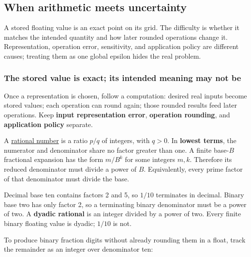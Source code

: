 \subsection{When arithmetic meets uncertainty}\label{01-foundations-i-ch001-when-arithmetic-meets-uncertainty}

\hypertarget{01-foundations-i-ch001-when-arithmetic-meets-uncertainty}{}

A stored floating value is an exact point on its grid. The difficulty is whether it matches the intended quantity and how later rounded operations change it. Representation, operation error, sensitivity, and application policy are different causes; treating them as one global epsilon hides the real problem.

\subsubsection{The stored value is exact; its intended meaning may not be}\label{01-foundations-i-ch001-the-stored-value-is-exact-its-intended-meaning-may-not-be}

\hypertarget{01-foundations-i-ch001-the-stored-value-is-exact-its-intended-meaning-may-not-be}{}

Once a representation is chosen, follow a computation: desired real inputs become stored values; each operation can round again; those rounded results feed later operations. Keep \textbf{input representation error}, \textbf{operation rounding}, and \textbf{application policy} separate.

A \hyperref[appendix-2a2f1b74bdd3]{rational number} is a ratio \(p/q\) of integers, with \(q>0\). In \textbf{lowest terms}, the numerator and denominator share no factor greater than one. A finite base-\(B\) fractional expansion has the form \(m/B^k\) for some integers \(m,k\). Therefore its reduced denominator must divide a power of \(B\). Equivalently, every prime factor of that denominator must divide the base.

Decimal base ten contains factors 2 and 5, so \(1/10\) terminates in decimal. Binary base two has only factor 2, so a terminating binary denominator must be a power of two. A \textbf{dyadic rational} is an integer divided by a power of two. Every finite binary floating value is dyadic; \(1/10\) is not.

To produce binary fraction digits without already rounding them in a float, track the remainder as an integer over denominator ten:

